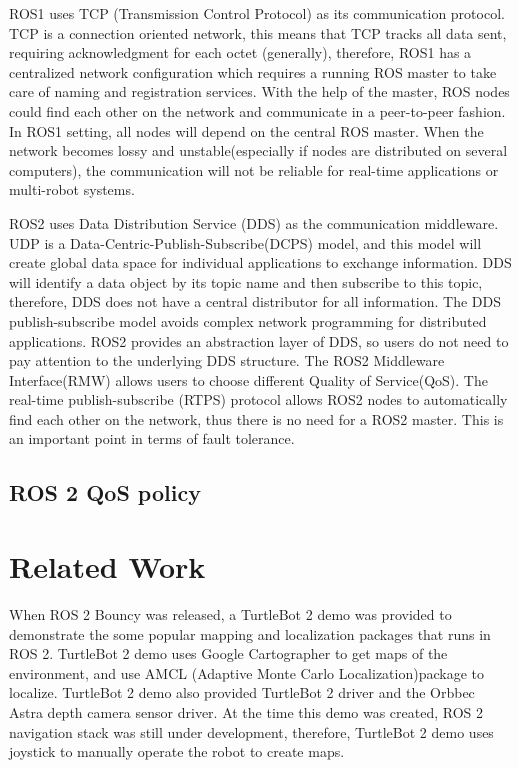\documentclass[letterpaper, 10 pt, conference]{ieeeconf}  %
\begin{document}
ROS1 uses TCP (Transmission Control Protocol) as its communication protocol. TCP is a connection oriented network, this means that TCP tracks all data sent, requiring acknowledgment for each octet (generally), therefore,  ROS1 has a centralized network configuration which requires a running ROS master to take care of naming and registration services. With the help of the master, ROS nodes could find each other on the network and communicate in a peer-to-peer fashion. In ROS1 setting, all nodes will depend on the central ROS master. When the network becomes lossy and unstable(especially if nodes are distributed on several computers), the communication will not be reliable for real-time applications or multi-robot systems.

ROS2 uses Data Distribution Service (DDS) as the communication middleware. UDP is a Data-Centric-Publish-Subscribe(DCPS) model, and this model will create global data space for individual applications to exchange information. DDS will identify a data object by its topic name and then subscribe to this topic, therefore, DDS does not have a central distributor for all information. The DDS publish-subscribe model avoids complex network programming for distributed applications.  ROS2 provides an abstraction layer of DDS, so users do not need to pay attention to the underlying DDS structure. The ROS2 Middleware Interface(RMW) allows users to choose different Quality of Service(QoS). The real-time publish-subscribe (RTPS) protocol allows ROS2 nodes to automatically find each other on the network, thus there is no need for a ROS2 master. This is an important point in terms of fault tolerance.


\subsection{ROS 2 QoS policy}

\section{Related Work}
When ROS 2 Bouncy was released, a TurtleBot 2 demo was provided to demonstrate the some popular mapping and localization packages that runs in ROS 2. TurtleBot 2 demo uses Google Cartographer to get maps of the environment, and use AMCL (Adaptive Monte Carlo Localization)package to localize. TurtleBot 2 demo also provided TurtleBot 2 driver and the Orbbec Astra depth camera sensor driver. At the time this demo was created, ROS 2 navigation stack was still under development, therefore, TurtleBot 2 demo uses joystick to manually operate the robot to create maps. 
\end{document}
